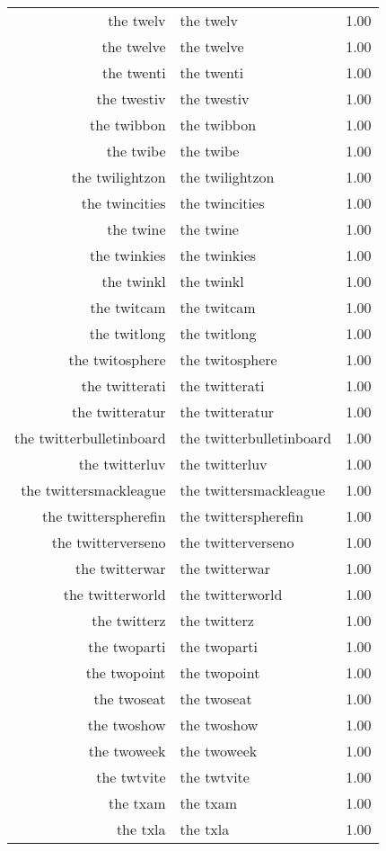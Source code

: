 \begin{table}[ht]
\begin{tabular}{rlr}
  the twelv & the twelv & 1.00 \\ 
  the twelve & the twelve & 1.00 \\ 
  the twenti & the twenti & 1.00 \\ 
  the twestiv & the twestiv & 1.00 \\ 
  the twibbon & the twibbon & 1.00 \\ 
  the twibe & the twibe & 1.00 \\ 
  the twilightzon & the twilightzon & 1.00 \\ 
  the twincities & the twincities & 1.00 \\ 
  the twine & the twine & 1.00 \\ 
  the twinkies & the twinkies & 1.00 \\ 
  the twinkl & the twinkl & 1.00 \\ 
  the twitcam & the twitcam & 1.00 \\ 
  the twitlong & the twitlong & 1.00 \\ 
  the twitosphere & the twitosphere & 1.00 \\ 
  the twitterati & the twitterati & 1.00 \\ 
  the twitteratur & the twitteratur & 1.00 \\ 
  the twitterbulletinboard & the twitterbulletinboard & 1.00 \\ 
  the twitterluv & the twitterluv & 1.00 \\ 
  the twittersmackleague & the twittersmackleague & 1.00 \\ 
  the twitterspherefin & the twitterspherefin & 1.00 \\ 
  the twitterverseno & the twitterverseno & 1.00 \\ 
  the twitterwar & the twitterwar & 1.00 \\ 
  the twitterworld & the twitterworld & 1.00 \\ 
  the twitterz & the twitterz & 1.00 \\ 
  the twoparti & the twoparti & 1.00 \\ 
  the twopoint & the twopoint & 1.00 \\ 
  the twoseat & the twoseat & 1.00 \\ 
  the twoshow & the twoshow & 1.00 \\ 
  the twoweek & the twoweek & 1.00 \\ 
  the twtvite & the twtvite & 1.00 \\ 
  the txam & the txam & 1.00 \\ 
  the txla & the txla & 1.00 \\ 

\end{tabular}
\end{table}
